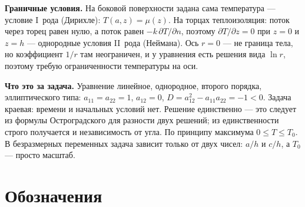\documentclass[a4paper,12pt]{article}
\renewcommand{\le}{\leqslant}
\begin{document}
\textbf{Граничные условия.} На боковой поверхности задана сама
температура — условие I~рода (Дирихле): $T(a,z)=\mu(z)$. На торцах
теплоизоляция: поток через торец равен нулю, а поток равен
$-k\,\partial T/\partial n$, поэтому $\partial T/\partial z=0$ при $z=0$
и $z=h$ — однородные условия II~рода (Неймана). Ось $r=0$ — не граница
тела, но коэффициент $1/r$ там неограничен, и у уравнения есть решения вида
$\ln r$, поэтому требую ограниченности температуры на оси.

\textbf{Что это за задача.} Уравнение линейное, однородное, второго
порядка, эллиптического типа: $a_{11}=a_{22}=1$, $a_{12}=0$,
$D=a_{12}^2-a_{11}a_{22}=-1<0$. Задача краевая: времени и начальных условий
нет. Решение единственно — это следует из формулы Остроградского для
разности двух решений; из единственности строго получается и независимость
от угла. По принципу максимума $0\le T\le T_0$. В безразмерных переменных
задача зависит только от двух чисел: $a/h$ и $c/h$, а $T_0$ — просто
масштаб.

\section{Обозначения}
\label{sec:notation}
\end{document}
